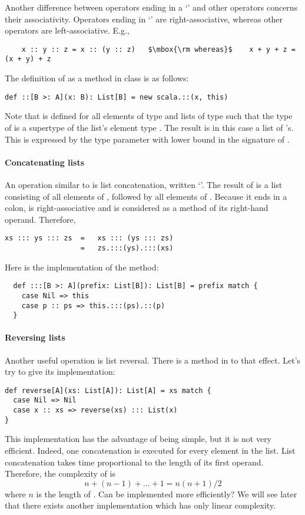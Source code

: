 Another difference between operators ending in a `\code{:}' and other
operators concerns their associativity.  Operators ending in
`\code{:}' are right-associative, whereas other operators are
left-associative.  E.g.,
\begin{lstlisting}
    x :: y :: z = x :: (y :: z)   $\mbox{\rm whereas}$    x + y + z = (x + y) + z
\end{lstlisting}
The definition of \code{::} as a method in
class  is as follows:
\begin{lstlisting}
def ::[B >: A](x: B): List[B] = new scala.::(x, this)
\end{lstlisting}
Note that \code{::} is defined for all elements  of type
 and lists of type  such that the type 
of  is a supertype of the list's element type . The result
is in this case a list of 's. This
is expressed by the type parameter  with lower bound 
in the signature of \code{::}. 

\paragraph{Concatenating lists}
An operation similar to \code{::} is list concatenation, written
`\code{:::}'. The result of  is a list consisting of
all elements of , followed by all elements of .
Because it ends in a colon, \code{:::} is right-associative and is
considered as a method of its right-hand operand. Therefore,
\begin{lstlisting}
xs ::: ys ::: zs  =   xs ::: (ys ::: zs)
                  =   zs.:::(ys).:::(xs)
\end{lstlisting}
Here is the implementation of the \code{:::} method:
\begin{lstlisting}
  def :::[B >: A](prefix: List[B]): List[B] = prefix match {
    case Nil => this
    case p :: ps => this.:::(ps).::(p)
  }
\end{lstlisting}

\paragraph{Reversing lists} Another useful operation
is list reversal. There is a method  in  to
that effect. Let's try to give its implementation:
\begin{lstlisting}
def reverse[A](xs: List[A]): List[A] = xs match {
  case Nil => Nil
  case x :: xs => reverse(xs) ::: List(x)
}
\end{lstlisting}
This implementation has the advantage of being simple, but it is not
very efficient.  Indeed, one concatenation is executed for every
element in the list. List concatenation takes time proportional to the
length of its first operand. Therefore, the complexity of
 is
\[
n + (n - 1) + ... + 1 = n(n+1)/2
\]
where $n$ is the length of . Can  be
implemented more efficiently? We will see later that there exists
another implementation which has only linear complexity.

